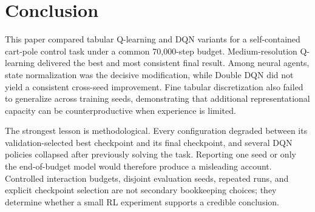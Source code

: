 \documentclass[conference]{IEEEtran}
\begin{document}
\section{Conclusion}

This paper compared tabular Q-learning and DQN variants for a self-contained
cart-pole control task under a common 70,000-step budget. Medium-resolution
Q-learning delivered the best and most consistent final result. Among neural
agents, state normalization was the decisive modification, while Double DQN
did not yield a consistent cross-seed improvement. Fine tabular
discretization also failed to generalize across training seeds, demonstrating
that additional representational capacity can be counterproductive when
experience is limited.

The strongest lesson is methodological. Every configuration degraded between
its validation-selected best checkpoint and its final checkpoint, and several
DQN policies collapsed after previously solving the task. Reporting one seed
or only the end-of-budget model would therefore produce a misleading account.
Controlled interaction budgets, disjoint evaluation seeds, repeated runs,
and explicit checkpoint selection are not secondary bookkeeping choices;
they determine whether a small RL experiment supports a credible conclusion.



\end{document}
